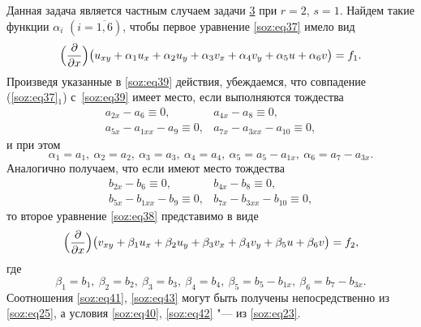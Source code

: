 Данная задача является частным случаем задачи \hyperlink{soz:task3}{\rm 3}  при $r=2$, $s=1$. 
Найдем такие функции $\alpha_{i}$  $(i=\overline{1,6})$, чтобы первое уравнение \eqref{soz:eq37}
имело вид
\begin{equation}
\Bigl(\frac{\partial}{\partial x}\Bigr)\bigl(u_{xy}+\alpha_{1}u_{x}+\alpha_{2}u_{y}+\alpha_{3}v_{x}+\alpha_{4}v_{y}+\alpha_{5}u+\alpha_{6}v\bigr)=f_{1}.
 \label{soz:eq39}
\end{equation}
Произведя указанные в \eqref{soz:eq39}  действия, убеждаемся, что  совпадение (\ref{soz:eq37}$_1$)  с~\eqref{soz:eq39} имеет место, если
выполняются тождества
\begin{equation}
\begin{array}{rl}
a_{2x}-a_{6}\equiv0, & a_{4x}-a_{8}\equiv0,\\
a_{5x}-a_{1xx}-a_{9}\equiv0, & a_{7x}-a_{3xx}-a_{10}\equiv0,
\end{array}
 \label{soz:eq40}
\end{equation}
и при этом
\begin{equation}
 \label{soz:eq41}
\alpha_{1}=a_{1},\ \alpha_{2}=a_{2},\ \alpha_{3}=a_{3},\ \alpha_{4}=a_{4},\ \alpha_{5}=a_{5}-a_{1x},\ \alpha_{6}=a_{7}-a_{3x}.
\end{equation}
Аналогично получаем, что если имеют место тождества
\begin{equation}
 \label{soz:eq42}
 \begin{array}{rl}
 b_{2x}-b_{6}\equiv0, & b_{4x}-b_{8}\equiv0,\\
b_{5x}-b_{1xx}-b_{9}\equiv0, & b_{7x}-b_{3xx}-b_{10}\equiv0,
\end{array}
\end{equation}
то второе уравнение \eqref{soz:eq38} представимо в виде
\begin{equation}
\Bigl(\frac{\partial}{\partial x}\Bigr)\bigl(v_{xy}+\beta_{1}u_{x}+\beta_{2}u_{y}+\beta_{3}v_{x}+\beta_{4}v_{y}+\beta_{5}u+\beta_{6}v\bigr)=f_{2},
\end{equation}
где
\begin{equation}
 \label{soz:eq43}
\beta_{1}=b_{1},\ \beta_{2}=b_{2},\ \beta_{3}=b_{3},\ \beta_{4}=b_{4},\ \beta_{5}=b_{5}-b_{1x},\ \beta_{6}=b_{7}-b_{3x}.
\end{equation}
 Соотношения \eqref{soz:eq41}, \eqref{soz:eq43}  могут быть получены непосредственно из \eqref{soz:eq25}, а условия \eqref{soz:eq40}, \eqref{soz:eq42} "--- из \eqref{soz:eq23}.

